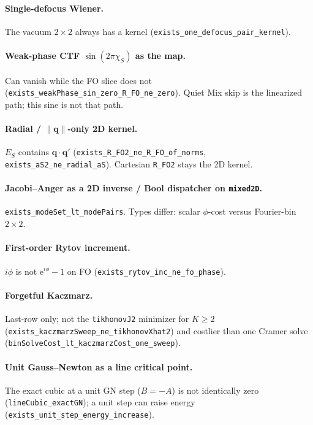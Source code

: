 \documentclass[11pt,a4paper]{article}
\theoremstyle{definition}
\theoremstyle{remark}
\newcommand{\ee}{\mathrm{e}}
\newcommand{\norm}[1]{\lVert#1\rVert}
\begin{document}
\paragraph{Single-defocus Wiener.}
The vacuum $2\times 2$ always has a kernel
(\texttt{exists\_one\_defocus\_pair\_kernel}).

\paragraph{Weak-phase CTF $\sin(2\pi\chi_S)$ as the map.}
Can vanish while the FO slice does not
(\texttt{exists\_weakPhase\_sin\_zero\_R\_FO\_ne\_zero}).
Quiet Mix skip is the linearized path; this sine is not that path.

\paragraph{Radial / $\norm{\mathbf{q}}$-only 2D kernel.}
$E_S$ contains $\mathbf{q}\cdot\mathbf{q}'$
(\texttt{exists\_R\_FO2\_ne\_R\_FO\_of\_norms},
\texttt{exists\_aS2\_ne\_radial\_aS}).
Cartesian \texttt{R\_FO2} stays the 2D kernel.

\paragraph{Jacobi--Anger as a 2D inverse / Bool dispatcher on \texttt{mixed2D}.}
\texttt{exists\_modeSet\_lt\_modePairs}. Types differ: scalar $\phi$-cost
versus Fourier-bin $2\times 2$.

\paragraph{First-order Rytov increment.}
$i\phi$ is not $\ee^{i\phi}-1$ on FO
(\texttt{exists\_rytov\_inc\_ne\_fo\_phase}).

\paragraph{Forgetful Kaczmarz.}
Last-row only; not the \texttt{tikhonovJ2} minimizer for $K\ge 2$
(\texttt{exists\_kaczmarzSweep\_ne\_tikhonovXhat2}) and costlier than
one Cramer solve (\texttt{binSolveCost\_lt\_kaczmarzCost\_one\_sweep}).

\paragraph{Unit Gauss--Newton as a line critical point.}
The exact cubic at a unit GN step ($B=-A$) is not identically zero
(\texttt{lineCubic\_exactGN}); a unit step can raise energy
(\texttt{exists\_unit\_step\_energy\_increase}).
\end{document}
